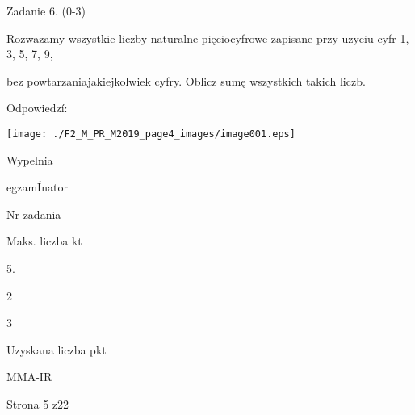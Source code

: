 \documentclass[a4paper,12pt]{article}
\begin{document}
Zadanie 6. (0-3)

Rozwazamy wszystkie liczby naturalne pięciocyfrowe zapisane przy uzyciu cyfr 1, 3, 5, 7, 9,

bez powtarzaniajakiejkolwiek cyfry. Oblicz sumę wszystkich takich liczb.

Odpowiedzí:
\begin{center}
\texttt{[image: ./F2\_M\_PR\_M2019\_page4\_images/image001.eps]}
\end{center}
Wypelnia

egzamÍnator

Nr zadania

Maks. liczba kt

5.

2

3

Uzyskana liczba pkt

MMA-IR

Strona 5 z22
\end{document}
